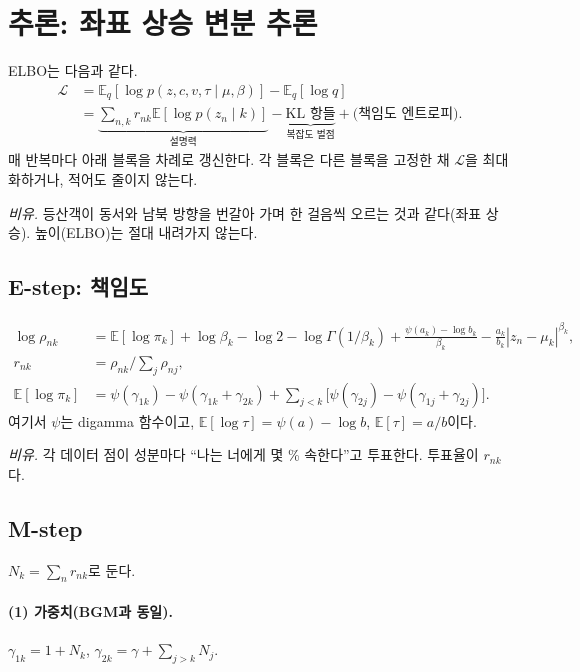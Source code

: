 \documentclass[11pt]{article}
\newcommand{\E}{\mathbb{E}}
\begin{document}
\section{추론: 좌표 상승 변분 추론}

ELBO는 다음과 같다.
\begin{align}
  \mathcal{L}&=\E_q[\log p(z,c,v,\tau\mid\mu,\beta)]-\E_q[\log q]\nonumber\\
  &=\underbrace{\textstyle\sum_{n,k}r_{nk}\E[\log p(z_n\mid k)]}_{\text{설명력}}
   -\underbrace{\mathrm{KL}\text{ 항들}}_{\text{복잡도 벌점}}+\text{(책임도 엔트로피)}.
\end{align}
매 반복마다 아래 블록을 차례로 갱신한다. 각 블록은 다른 블록을 고정한 채 $\mathcal{L}$을 최대화하거나, 적어도 줄이지 않는다.

\emph{비유.} 등산객이 동서와 남북 방향을 번갈아 가며 한 걸음씩 오르는 것과 같다(좌표 상승). 높이(ELBO)는 절대 내려가지 않는다.

\subsection{E-step: 책임도}
\begin{align}
  \log\rho_{nk}&=\E[\log\pi_k]+\log\beta_k-\log2-\log\Gamma(1/\beta_k)
     +\frac{\psi(a_k)-\log b_k}{\beta_k}-\frac{a_k}{b_k}|z_n-\mu_k|^{\beta_k},\\
  r_{nk}&=\rho_{nk}\big/\textstyle\sum_j\rho_{nj},\\
  \E[\log\pi_k]&=\psi(\gamma_{1k})-\psi(\gamma_{1k}+\gamma_{2k})+\textstyle\sum_{j<k}\big[\psi(\gamma_{2j})-\psi(\gamma_{1j}+\gamma_{2j})\big].
\end{align}
여기서 $\psi$는 digamma 함수이고, $\E[\log\tau]=\psi(a)-\log b$, $\E[\tau]=a/b$이다.

\emph{비유.} 각 데이터 점이 성분마다 ``나는 너에게 몇 \% 속한다''고 투표한다. 투표율이 $r_{nk}$다.

\subsection{M-step}\label{sec:mstep}
$N_k=\sum_n r_{nk}$로 둔다.

\paragraph{(1) 가중치(BGM과 동일).}
$\gamma_{1k}=1+N_k$, $\gamma_{2k}=\gamma+\sum_{j>k}N_j$.
\end{document}
